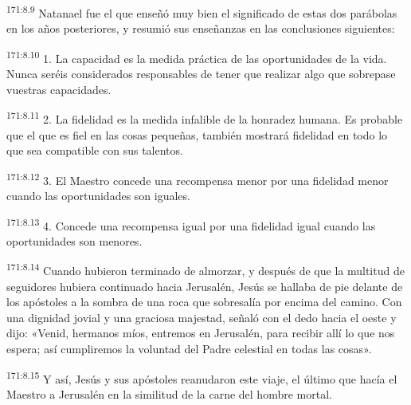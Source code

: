 \par 
\textsuperscript{171:8.9} Natanael fue el que enseñó muy bien el significado de estas dos parábolas en los años posteriores, y resumió sus enseñanzas en las conclusiones siguientes:

\par 
\textsuperscript{171:8.10} 1. La capacidad es la medida práctica de las oportunidades de la vida. Nunca seréis considerados responsables de tener que realizar algo que sobrepase vuestras capacidades.

\par 
\textsuperscript{171:8.11} 2. La fidelidad es la medida infalible de la honradez humana. Es probable que el que es fiel en las cosas pequeñas, también mostrará fidelidad en todo lo que sea compatible con sus talentos.

\par 
\textsuperscript{171:8.12} 3. El Maestro concede una recompensa menor por una fidelidad menor cuando las oportunidades son iguales.

\par 
\textsuperscript{171:8.13} 4. Concede una recompensa igual por una fidelidad igual cuando las oportunidades son menores.

\par 
\textsuperscript{171:8.14} Cuando hubieron terminado de almorzar, y después de que la multitud de seguidores hubiera continuado hacia Jerusalén, Jesús se hallaba de pie delante de los apóstoles a la sombra de una roca que sobresalía por encima del camino. Con una dignidad jovial y una graciosa majestad, señaló con el dedo hacia el oeste y dijo: «Venid, hermanos míos, entremos en Jerusalén, para recibir allí lo que nos espera; así cumpliremos la voluntad del Padre celestial en todas las cosas».

\par 
\textsuperscript{171:8.15} Y así, Jesús y sus apóstoles reanudaron este viaje, el último que hacía el Maestro a Jerusalén en la similitud de la carne del hombre mortal.